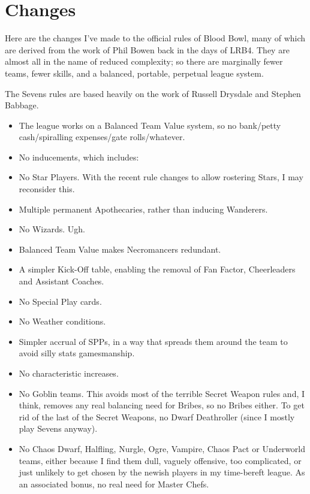 \section{Changes}

\begin{multicols}{2}

\par Here are the changes I've made to the official rules of Blood Bowl, many of which are derived from the work of Phil Bowen back in the days of LRB4. They are almost all in the name of reduced complexity; so there are marginally fewer teams, fewer skills, and a balanced, portable, perpetual league system.
\par The Sevens rules are based heavily on the work of Russell Drysdale and Stephen Babbage.

\begin{itemize}
\item The league works on a Balanced Team Value system, so no bank/petty cash/spiralling expenses/gate rolls/whatever.
\item No inducements, which includes:
\item No Star Players. With the recent rule changes to allow rostering Stars, I may reconsider this.
\item Multiple permanent Apothecaries, rather than inducing Wanderers.
\item No Wizards. Ugh.
\item Balanced Team Value makes Necromancers redundant.
\item A simpler Kick-Off table, enabling the removal of Fan Factor, Cheerleaders and Assistant Coaches.
\item No Special Play cards.
\item No Weather conditions.
\item Simpler accrual of SPPs, in a way that spreads them around the team to avoid silly stats gamesmanship.
\item No characteristic increases.
\item No Goblin teams. This avoids most of the terrible Secret Weapon rules and, I think, removes any real balancing need for Bribes, so no Bribes either. To get rid of the last of the Secret Weapons, no Dwarf Deathroller (since I mostly play Sevens anyway).
\item No Chaos Dwarf, Halfling, Nurgle, Ogre, Vampire, Chaos Pact or Underworld teams, either because I find them dull, vaguely offensive, too complicated, or just unlikely to get chosen by the newish players in my time-bereft league. As an associated bonus, no real need for Master Chefs.

\end{itemize}
\end{multicols}
